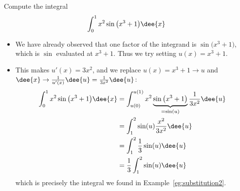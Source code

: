 %
\begin{eg}
                                               \label{eg:substitution3}
Compute the integral
\begin{align*}
\int_0^1 x^2\sin\big(x^3+1\big)\dee{x}
\end{align*}
\soln
\begin{itemize}
 \item We have already observed that one factor of the integrand is
$\sin\big(x^3+1\big)$, which is $\sin$ evaluated at $x^3+1$. Thus we try setting
$u(x)=x^3+1$.
\item This makes $u'(x)=3x^2$, and we replace $u(x)=x^3+1\rightarrow u$ and
$\dee{x}\rightarrow\frac{1}{u'(x)}\dee{u} = \frac{1}{3x^2}\dee{u}$:
\begin{align*}
  \int_0^1 x^2\sin\big(x^3+1\big)\dee{x}
&= \int_{u(0)}^{u(1)} x^2\underbrace{\sin\big(x^3+1\big)}_{=\sin(u)}
\frac{1}{3x^2}\dee{u} \\
&= \int_{1}^{2} \sin(u) \frac{x^2}{3x^2}\dee{u}\\
&= \int_{1}^{2} \frac{1}{3}\sin(u) \dee{u} \\
&= \frac{1}{3}\int_{1}^{2} \sin(u) \dee{u}
\end{align*}
which is precisely the integral we found in Example~\ref{eg:substitution2}.
\end{itemize}

\end{eg}

